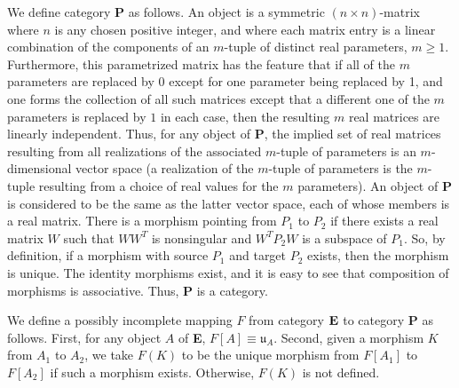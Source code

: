 \documentclass{amsart}
\numberwithin{equation}{section}
\theoremstyle{definition}
\numberwithin{theorem}{section}
\begin{document}
We define category {\bf P} as follows. An object is a symmetric $(n\times n)$-matrix where $n$ is any chosen positive integer, and where each matrix entry is a linear combination of the components of an $m$-tuple of distinct real parameters, $m\ge 1$.  Furthermore, this parametrized matrix has the feature that if all of the $m$ parameters are replaced by 0 except for one parameter being replaced by 1, and one forms the collection of all such matrices except that a different one of the $m$ parameters is replaced by $1$ in each case, then the resulting $m$ real matrices are linearly independent.  Thus, for any object of {\bf P}, the implied set of real matrices resulting from all realizations of the associated $m$-tuple of parameters is an $m$-dimensional vector space (a realization of the $m$-tuple of parameters is the $m$-tuple resulting from a choice of real values for the $m$ parameters).  An object of {\bf P} is considered to be the same as the latter vector space, each of whose members is a real matrix.   There is a morphism pointing from $P_1$ to $P_2$ if there exists a real matrix $W$ such that $WW^T$ is nonsingular and $W^TP_2W$ is a subspace of $P_1$.   So, by definition, if a morphism with source $P_1$ and target $P_2$ exists, then the morphism is unique.
The identity morphisms exist, and it is easy to see that composition of morphisms is associative.  Thus, {\bf P} is a category.

We define a possibly incomplete mapping $F$ from category ${\bf E}$ to category {\bf P} as follows.  First, for any object $A$ of {\bf E}, $F[
A] \equiv \mathfrak{u}_A$.  Second, given a morphism $K$ from $A_1$ to $A_2$, we take $F(K)$ to be the unique morphism from $F[A_1]$ to $F[A_2]$ if such a morphism exists. Otherwise, $F(K)$ is not defined.   
\end{document}
